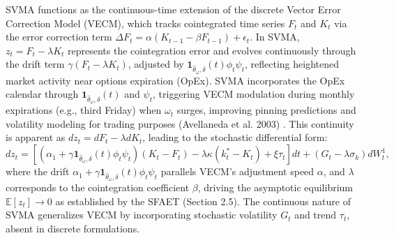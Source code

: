 \documentclass[12pt]{report}
\begin{document}
SVMA functions as the continuous-time extension of the discrete Vector Error Correction Model (VECM), which tracks cointegrated time series \(F_t\) and \(K_t\) via the error correction term \(\Delta F_t = \alpha (K_{t-1} - \beta F_{t-1}) + \epsilon_t\). In SVMA, \(z_t = F_t - \lambda K_t\) represents the cointegration error and evolves continuously through the drift term \(\gamma (F_t - \lambda K_t)\), adjusted by \(\mathbf{1}_{\hat{\theta}_\omega, \delta}(t) \phi_t \psi_t\), reflecting heightened market activity near options expiration (OpEx). SVMA incorporates the OpEx calendar through \(\mathbf{1}_{\hat{\theta}_\omega, \delta}(t)\) and \(\psi_t\), triggering VECM modulation during monthly expirations (e.g., third Friday) when \(\omega_t\) surges, improving pinning predictions and volatility modeling for trading purposes (Avellaneda et al. 2003) \cite{avellaneda2003}. This continuity is apparent as \(dz_t = dF_t - \lambda dK_t\), leading to the stochastic differential form:
\[
    dz_t = \left[ (\alpha_1 + \gamma \mathbf{1}_{\hat{\theta}_\omega, \delta}(t) \phi_t \psi_t) (K_t - F_t) - \lambda \kappa (k_t^* - K_t) + \xi \tau_t \right] dt + (G_t - \lambda \sigma_k) dW_t^1,
\]
where the drift \(\alpha_1 + \gamma \mathbf{1}_{\hat{\theta}_\omega, \delta}(t) \phi_t \psi_t\) parallels VECM’s adjustment speed \(\alpha\), and $\lambda$ corresponds to the cointegration coefficient $\beta$, driving the asymptotic equilibrium $\mathbb{E}[z_t] \to 0$ as established by the SFAET (Section 2.5). The continuous nature of SVMA generalizes VECM by incorporating stochastic volatility \(G_t\) and trend \(\tau_t\), absent in discrete formulations.

\vspace{0.2in}
\end{document}
